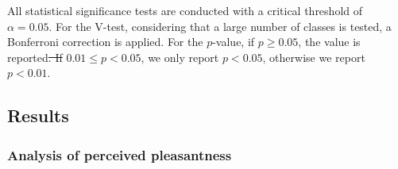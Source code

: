 \documentclass[12pt]{elsarticle}
\providecommand{\DIFadd}[1]{{\protect\color{blue}\uwave{#1}}} %
\providecommand{\DIFdel}[1]{{\protect\color{red}\sout{#1}}}                      %
\providecommand{\DIFaddbegin}{} %
\providecommand{\DIFaddend}{} %
\providecommand{\DIFdelbegin}{} %
\providecommand{\DIFdelend}{} %
\begin{document}

All statistical significance tests are conducted with a critical threshold of $\alpha=0.05$. For the V-test, considering that a large number of classes is tested, a Bonferroni correction is applied. For the $p$-value, if $p\geq0.05$, the value is reported\DIFdelbegin \DIFdel{. If }\DIFdelend \DIFaddbegin \DIFadd{; if }\DIFaddend $0.01\leq p<0.05$, we only report $p<0.05$, otherwise we report $p<0.01$.

\DIFaddbegin 

\DIFaddend \subsection{Results}

\subsubsection*{Analysis of perceived pleasantness}

\end{document}
